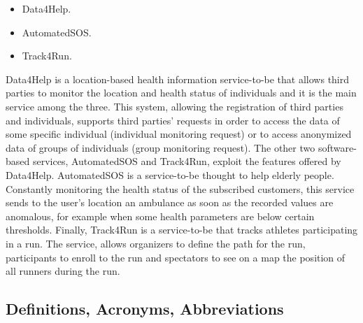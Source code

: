 \begin{itemize}[noitemsep,nolistsep]
\item Data4Help.
\item AutomatedSOS.
\item Track4Run.
\end{itemize}
\bigbreak
\noindent
Data4Help is a location-based health information service-to-be that allows third parties to monitor the location and health status of individuals and it is the main service among the three. This system, allowing the registration of third parties and individuals, supports third parties' requests in order to access the data of some specific individual (individual monitoring request) or to access anonymized data of groups of individuals (group monitoring request). The other two software-based services, AutomatedSOS and Track4Run, exploit the features offered by Data4Help.
\bigbreak
\noindent
AutomatedSOS is a service-to-be thought to help elderly people. Constantly monitoring the health status of the subscribed customers, this service sends to the user's location an ambulance as soon as the recorded values are anomalous, for example when some health parameters are below certain thresholds.
\bigbreak
\noindent
Finally, Track4Run is a service-to-be that tracks athletes participating in a run. The service, allows organizers to define the path for the run, participants to enroll to the run and spectators to see on a map the position of all runners during the run.
\subsection{Definitions, Acronyms, Abbreviations}

